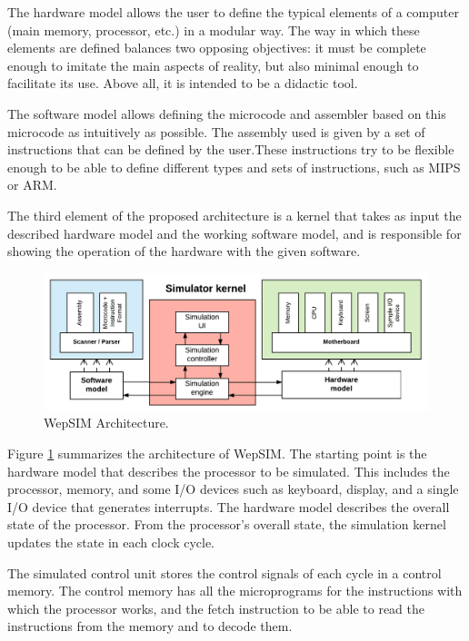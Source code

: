 The hardware model allows the user to define the typical elements of a computer (main memory, processor, etc.) in a modular way. The way in which these elements are defined balances two opposing objectives: it must be complete enough to imitate the main aspects of reality, but also minimal enough to facilitate its use. Above all, it is intended to be a didactic tool.

The software model allows defining the microcode and assembler based on this microcode as intuitively as possible. The assembly used is given by a set of instructions that can be defined by the user.These instructions try to be flexible enough to be able to define different types and sets of instructions, such as MIPS or ARM.

The third element of the proposed architecture is a kernel that takes as input the described hardware model and the working software model, and is responsible for showing the operation of the hardware with the given software.

\begin{figure}[htbp]
 	\centering
 	\includegraphics[width=14cm]{figures/architecture_diagram}
 	\caption{WepSIM Architecture.}
	\label{fig:architecture_diagram_summary}
\end{figure}

Figure \ref{fig:architecture_diagram_summary} summarizes the architecture of WepSIM. The starting point is the hardware model that describes the processor to be simulated. This includes the processor, memory, and some I/O devices such as keyboard, display, and a single I/O device that generates interrupts. The hardware model describes the overall state of the processor. From the processor's overall state, the simulation kernel updates the state in each clock cycle.

The simulated control unit stores the control signals of each cycle in a control memory. The control memory has all the microprograms for the instructions with which the processor works, and the fetch instruction to be able to read the instructions from the memory and to decode them.

